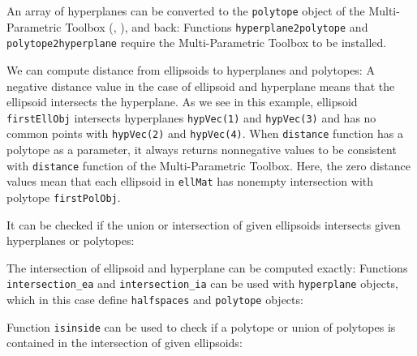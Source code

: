 An array of hyperplanes can be converted to the {\tt polytope} object of the
Multi-Parametric Toolbox (\cite{KVASNICA_GRIEDER_BAOTIC_MORARI_HYBRID_SYSTEMS_COMPUTATION_AND_CONTROL}, \cite{MULTI_PARAMETRIC_TOOLBOX_HOMEPAGE}), and back:
Functions {\tt hyperplane2polytope} and {\tt polytope2hyperplane} require
the Multi-Parametric Toolbox to be installed.

We can compute distance from ellipsoids to hyperplanes and polytopes:
A negative distance value in the case of ellipsoid and hyperplane means that
the ellipsoid intersects the hyperplane. As we see in this example, ellipsoid
{\tt firstEllObj} intersects  hyperplanes {\tt hypVec(1)} and {\tt hypVec(3)} and has
no common points with {\tt hypVec(2)} and {\tt hypVec(4)}. When {\tt distance} function
has a polytope as a parameter, it always returns nonnegative values to be
consistent with {\tt distance} function of the Multi-Parametric Toolbox.
Here, the zero distance values mean that each ellipsoid in {\tt ellMat} has
nonempty intersection with polytope {\tt firstPolObj}.

It can be checked if the union or intersection of given ellipsoids intersects
given hyperplanes or polytopes:



The intersection of ellipsoid and hyperplane can be computed exactly:
Functions {\tt intersection\_ea} and {\tt intersection\_ia} can be used
with {\tt hyperplane} objects, which in this case define {\tt halfspaces} and
{\tt polytope} objects:

Function {\tt isinside} can be used to check if a polytope or union of
polytopes is contained in the intersection of given ellipsoids:


